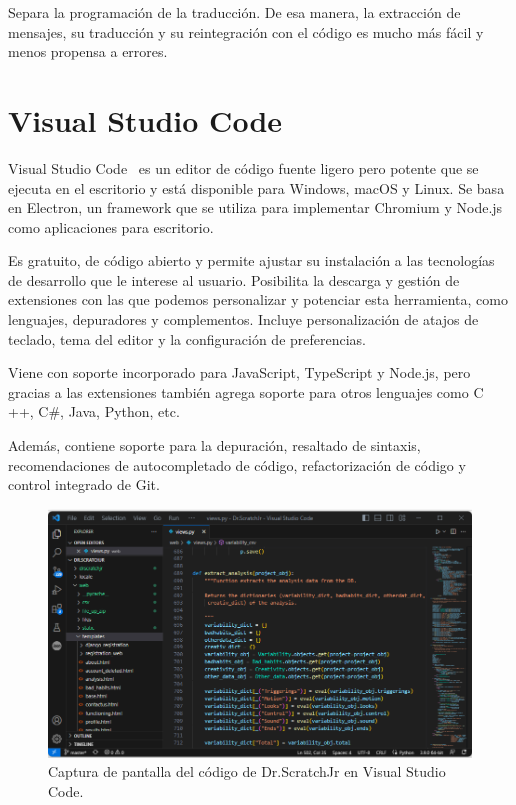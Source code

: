 \documentclass[a4paper, 12pt]{book}
\begin{document}
\vspace{5mm}
Separa la programación de la traducción. 
De esa manera, la extracción de mensajes, su traducción y su reintegración con el código es mucho más fácil y menos propensa a errores.

\section{Visual Studio Code} 
\label{sec:visual-studio-code}

Visual Studio Code~\cite{visualstudio} es un editor de código fuente ligero pero potente que se ejecuta en el escritorio y está disponible para Windows, macOS y Linux.
Se basa en Electron, un framework que se utiliza para implementar Chromium y Node.js como aplicaciones para escritorio.

\vspace{5mm}
Es gratuito, de código abierto y permite ajustar su instalación a las tecnologías de desarrollo que le interese al usuario.
Posibilita la descarga y gestión de extensiones con las que podemos personalizar y potenciar esta herramienta, como lenguajes, depuradores y complementos.
Incluye personalización de atajos de teclado, tema del editor y la configuración de preferencias.

\vspace{5mm}
Viene con soporte incorporado para JavaScript, TypeScript y Node.js, pero gracias a las extensiones también agrega soporte para otros lenguajes como C ++, C\#, Java, Python, etc.

\vspace{5mm}
Además, contiene soporte para la depuración, resaltado de sintaxis, recomendaciones de autocompletado de código, refactorización de código y control integrado de Git.

\begin{figure}[ht]
  \centering
  \includegraphics[width=16cm, keepaspectratio]{img/visualstudiocode.png}
  \caption{Captura de pantalla del código de Dr.ScratchJr en Visual Studio Code.}\label{fig:visualstudiocode}
\end{figure}
\end{document}
